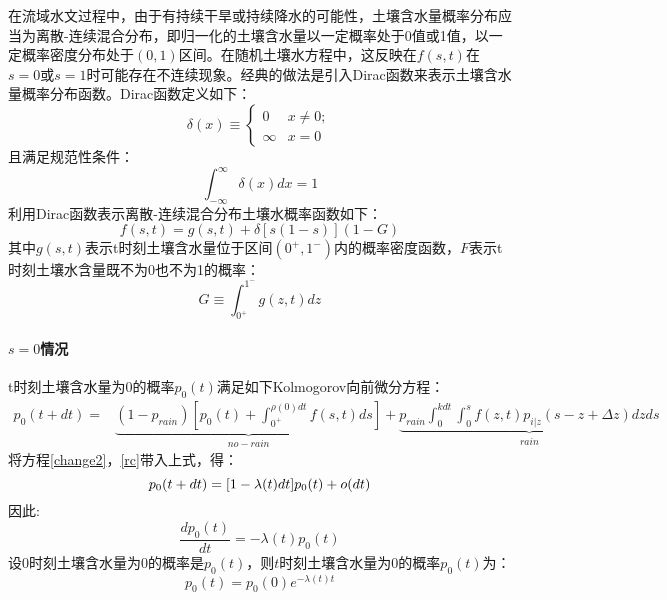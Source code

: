 在流域水文过程中，由于有持续干旱或持续降水的可能性，土壤含水量概率分布应当为离散-连续混合分布，即归一化的土壤含水量以一定概率处于0值或1值，以一定概率密度分布处于$(0,1)$区间。在随机土壤水方程中，这反映在$f(s,t)$在$s=0$或$s=1$时可能存在不连续现象。经典的做法是引入Dirac函数来表示土壤含水量概率分布函数。Dirac函数定义如下：
 \begin{equation}
 \delta(x)\equiv
 \begin{cases}
 0&x\neq0;\\\infty&x=0
 \end{cases}
 \end{equation}
且满足规范性条件：
 \begin{equation}
 \int_{-\infty}^{\infty} \delta(x)dx=1
 \end{equation}
利用Dirac函数表示离散-连续混合分布土壤水概率函数如下：
 \begin{equation}
 f(s,t)=g(s,t)+\delta[s(1-s)](1-G)
 \end{equation} 
 其中$g(s,t)$表示t时刻土壤含水量位于区间$(0^+,1^-)$内的概率密度函数，$F$表示t时刻土壤水含量既不为0也不为1的概率：
 \begin{equation}
G\equiv\int_{0^+}^{1^-} g(z,t)dz
 \end{equation}

\paragraph{$s=0$情况}
t时刻土壤含水量为0的概率$p_0(t)$满足如下Kolmogorov向前微分方程：
\begin{equation}
\label{basic00}
\begin{split}
p_0(t+dt)=&\underbrace{(1-p_{rain})[p_0(t)+\int_{0^{+}}^{\rho (0)dt} f(s,t)ds]}_{no-rain} +\underbrace{p_{rain} \int_{0}^{kdt}\int_{0}^{s} f(z,t)p_{i|z}(s-z+\Delta z)dzds}_{rain}
\end{split}
\end{equation}
将方程\ref{change2}，\ref{rc}带入上式，得：
 \begin{equation}
 p_0(t+dt)\\=[1-\lambda(t)dt]p_0(t)+o(dt)
 \end{equation} 
 因此:
 \begin{equation}
 \frac{dp_0(t)}{dt}=-\lambda(t) p_0(t)
 \end{equation}
设$0$时刻土壤含水量为0的概率是$p_0(t)$，则$t$时刻土壤含水量为0的概率$p_0(t)$为： 
 \begin{equation}
 p_0(t)=p_0(0)e^{-\lambda(t) t}
 \end{equation}

